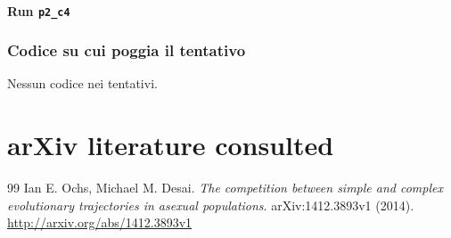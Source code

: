 \documentclass[11pt,a4paper]{article}
\begin{document}
\paragraph{Run \texttt{p2\_c4}}

\subsubsection{Codice su cui poggia il tentativo}
Nessun codice nei tentativi.

\section{arXiv literature consulted}
\begin{thebibliography}{99}
 Ian E. Ochs, Michael M. Desai. \emph{The competition between simple and complex evolutionary trajectories in asexual populations}. arXiv:1412.3893v1 (2014). \url{http://arxiv.org/abs/1412.3893v1}
\end{thebibliography}
\end{document}
